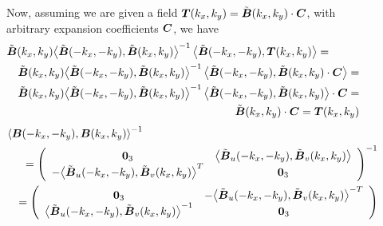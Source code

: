 \begin{figure}
{\begin{minipage} {142.0mm}
Now, assuming we are given a field ${\mbox{\boldmath$\mit T$\unboldmath}}(k_x,k_y)=\tilde{\mbox{\boldmath$\mit B$\unboldmath}}(k_x,k_y)\cdot {\mbox{\boldmath$\mit C$\unboldmath}}$, with arbitrary expansion coefficients $\mbox{\boldmath$\mit C$\unboldmath}$, we have
\begin{eqnarray*}
\lefteqn{ 
\tilde{\bmi  B}(k_x,k_y){\left\langle{\tilde{\bmi  B}(-k_x,-k_y),\tilde{\bmi  B}(k_x,k_y)}
\right\rangle}^{-1}\left\langle{\tilde{\bmi 
B}(-k_x,-k_y),{\bmi  T}(k_x,k_y)}\right\rangle=}\\
&&
\tilde{\bmi  B}(k_x,k_y){\left\langle{\tilde{\bmi  B}(-k_x,-k_y),\tilde{\bmi  B}(k_x,k_y)}
\right\rangle}^{-1}\left\langle{\tilde{\bmi 
B}(-k_x,-k_y),\tilde{\bmi  B}(k_x,k_y)\cdot 
 {\bmi  C}}\right\rangle=\\
&&\tilde{\bmi  B}(k_x,k_y){\left\langle{\tilde{\bmi  B}(-k_x,-k_y),
 \tilde{\bmi  B}(k_x,k_y)}\right\rangle}^{-1}
 \left\langle{\tilde{\bmi  B}(-k_x,-k_y),\tilde{\bmi  B}(k_x,k_y)}\right\rangle\cdot  
 {\bmi  C}=\\
&&\tilde{\bmi  B}(k_x,k_y)\cdot  
 {\bmi  C}={\bmi  T}(k_x,k_y)
\end{eqnarray*} 
\begin{eqnarray*}
\lefteqn{ 
{\left\langle{{\bmi  B }(-k_x,-k_y),{ \bmi  B }(k_x,k_y)}\right\rangle}^{\rm -1} 
}\\
&&={\left({\begin{array}{cc}{\bf 0}_{3}&\left\langle{\tilde{\bmi  B}_{u}(-k_x,-k_y),
\tilde{\bmi  B}_{v}(k_x,k_y)}\right\rangle\\ 
-{\left\langle{\tilde{\bmi  B}_{u}(-k_x,-k_y),\tilde{\bmi  B}_{v}
(k_x,k_y)}\right\rangle}^{T}&{\bf 0}_{3}\end{array}}\right)}^{-1}\\
&&=
\left({\begin{array}{cc}{\bf 0}_{3}&-{\left\langle{
\tilde{\bmi  B}_{u}(-k_x,-k_y),\tilde{\bmi  B}_{v}(k_x,k_y)}\right\rangle}^{-T}\\ 
{\left\langle{\tilde{\bmi  B}_{u}(-k_x,-k_y),\tilde{\bmi  B}_{v}(k_x,k_y)}\right\rangle}^{-1}
&{\bf 0}_{3}\end{array}}\right)
\end{eqnarray*} 

\vspace{6mm}
\end{minipage}
}
\end{figure}
